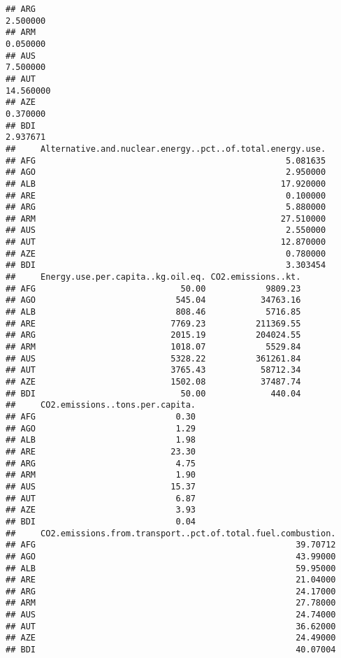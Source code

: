 \documentclass[]{article}
\begin{document}
\begin{verbatim}
## ARG                                                                            2.500000
## ARM                                                                            0.050000
## AUS                                                                            7.500000
## AUT                                                                           14.560000
## AZE                                                                            0.370000
## BDI                                                                            2.937671
##     Alternative.and.nuclear.energy..pct..of.total.energy.use.
## AFG                                                  5.081635
## AGO                                                  2.950000
## ALB                                                 17.920000
## ARE                                                  0.100000
## ARG                                                  5.880000
## ARM                                                 27.510000
## AUS                                                  2.550000
## AUT                                                 12.870000
## AZE                                                  0.780000
## BDI                                                  3.303454
##     Energy.use.per.capita..kg.oil.eq. CO2.emissions..kt.
## AFG                             50.00            9809.23
## AGO                            545.04           34763.16
## ALB                            808.46            5716.85
## ARE                           7769.23          211369.55
## ARG                           2015.19          204024.55
## ARM                           1018.07            5529.84
## AUS                           5328.22          361261.84
## AUT                           3765.43           58712.34
## AZE                           1502.08           37487.74
## BDI                             50.00             440.04
##     CO2.emissions..tons.per.capita.
## AFG                            0.30
## AGO                            1.29
## ALB                            1.98
## ARE                           23.30
## ARG                            4.75
## ARM                            1.90
## AUS                           15.37
## AUT                            6.87
## AZE                            3.93
## BDI                            0.04
##     CO2.emissions.from.transport..pct.of.total.fuel.combustion.
## AFG                                                    39.70712
## AGO                                                    43.99000
## ALB                                                    59.95000
## ARE                                                    21.04000
## ARG                                                    24.17000
## ARM                                                    27.78000
## AUS                                                    24.74000
## AUT                                                    36.62000
## AZE                                                    24.49000
## BDI                                                    40.07004
\end{verbatim}
\end{document}
